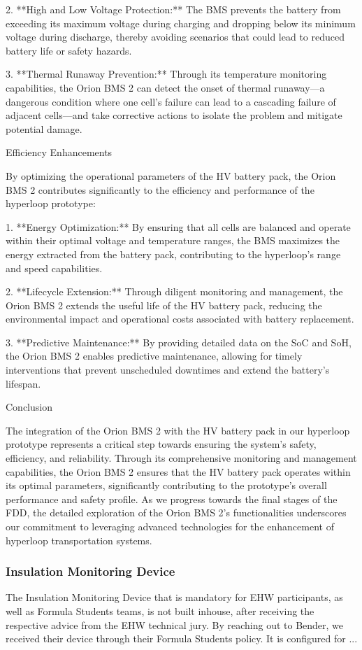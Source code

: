 2. **High and Low Voltage Protection:** The BMS prevents the battery from exceeding its maximum voltage during charging and dropping below its minimum voltage during discharge, thereby avoiding scenarios that could lead to reduced battery life or safety hazards.

3. **Thermal Runaway Prevention:** Through its temperature monitoring capabilities, the Orion BMS 2 can detect the onset of thermal runaway—a dangerous condition where one cell's failure can lead to a cascading failure of adjacent cells—and take corrective actions to isolate the problem and mitigate potential damage.

Efficiency Enhancements

By optimizing the operational parameters of the HV battery pack, the Orion BMS 2 contributes significantly to the efficiency and performance of the hyperloop prototype:

1. **Energy Optimization:** By ensuring that all cells are balanced and operate within their optimal voltage and temperature ranges, the BMS maximizes the energy extracted from the battery pack, contributing to the hyperloop's range and speed capabilities.

2. **Lifecycle Extension:** Through diligent monitoring and management, the Orion BMS 2 extends the useful life of the HV battery pack, reducing the environmental impact and operational costs associated with battery replacement.

3. **Predictive Maintenance:** By providing detailed data on the SoC and SoH, the Orion BMS 2 enables predictive maintenance, allowing for timely interventions that prevent unscheduled downtimes and extend the battery's lifespan.

Conclusion

The integration of the Orion BMS 2 with the HV battery pack in our hyperloop prototype represents a critical step towards ensuring the system's safety, efficiency, and reliability. Through its comprehensive monitoring and management capabilities, the Orion BMS 2 ensures that the HV battery pack operates within its optimal parameters, significantly contributing to the prototype's overall performance and safety profile. As we progress towards the final stages of the FDD, the detailed exploration of the Orion BMS 2's functionalities underscores our commitment to leveraging advanced technologies for the enhancement of hyperloop transportation systems.
\subsubsection{Insulation Monitoring Device}
The Insulation Monitoring Device that is mandatory for EHW participants, as well as Formula Students teams, is not built inhouse, after receiving the respective advice from the EHW technical jury. By reaching out to Bender, we received their device through their Formula Students policy. It is configured for ...


